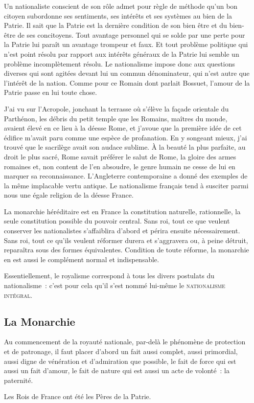\documentclass[french,twoside]{book} %
\newcommand{\astermono}{\medskip\centerline{\color{rubric}\large\selectfont{\syms ✻}}\medskip\par}%
\begin{document}
\astermono

\noindent Un nationaliste conscient de son rôle admet pour règle de méthode qu’un bon citoyen subordonne ses sentiments, ses intérêts et ses systèmes au bien de la Patrie. Il sait que la Patrie est la dernière condition de son bien être et du bien-être de ses concitoyens. Tout avantage personnel qui se solde par une perte pour la Patrie lui paraît un avantage trompeur et faux. Et tout problème politique qui n’est point résolu par rapport aux intérêts généraux de la Patrie lui semble un problème incomplètement résolu. Le nationalisme impose donc aux questions diverses qui sont agitées devant lui un commun dénominateur, qui n’est autre que l’intérêt de la nation. Comme pour ce Romain dont parlait Bossuet, l’amour de la Patrie passe en lui toute chose.\par
J’ai vu sur l’Acropole, jonchant la terrasse où s’élève la façade orientale du Parthénon, les débris du petit temple que les Romains, maîtres du monde, avaient élevé en ce lieu à la déesse Rome, et j’avoue que la première idée de cet édifice m’avait paru comme une espèce de profanation. En y songeant mieux, j’ai trouvé que le sacrilège avait son audace sublime. À la beauté la plus parfaite, au droit le plus sacré, Rome savait préférer le salut de Rome, la gloire des armes romaines et, non content de l’en absoudre, le genre humain ne cesse de lui en marquer sa reconnaissance. L’Angleterre contemporaine a donné des exemples de la même implacable vertu antique. Le nationalisme français tend à susciter parmi nous une égale religion de la déesse France.\par
La monarchie héréditaire est en France la constitution naturelle, rationnelle, la seule constitution possible du pouvoir central. Sans roi, tout ce que veulent conserver les nationalistes s’affaiblira d’abord et périra ensuite nécessairement. Sans roi, tout ce qu’ils veulent réformer durera et s’aggravera ou, à peine détruit, reparaîtra sous des formes équivalentes. Condition de toute réforme, la monarchie en est aussi le complément normal et indispensable.\par
Essentiellement, le royalisme correspond à tous les divers postulats du nationalisme : c’est pour cela qu’il s’est nommé lui-même le {\scshape nationalisme intégral}.\par

\astermono

\subsection[La Monarchie]{La Monarchie}
\noindent Au commencement de la royauté nationale, par-delà le phénomène de protection et de patronage, il faut placer d’abord un fait aussi complet, aussi primordial, aussi digne de vénération et d’admiration que possible, le fait de force qui est aussi un fait d’amour, le fait de nature qui est aussi un acte de volonté : la paternité.\par
Les Rois de France ont été les Pères de la Patrie.\par
\end{document}
